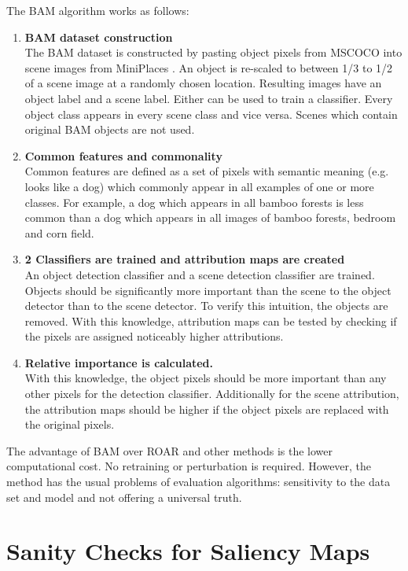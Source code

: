 The BAM algorithm works as follows:
\begin{enumerate}
	\item \textbf{BAM dataset construction}\\
	The BAM dataset is constructed by pasting object pixels from MSCOCO \cite{lin2015microsoft} into scene images from MiniPlaces \cite{zhou2016places}. An object is re-scaled to between 1/3 to 1/2 of a scene image at a randomly chosen location. Resulting images have an object label and a scene label. Either can be used to train a classifier. Every object class appears in every scene class and vice versa. Scenes which contain original BAM objects are not used.
	\item \textbf{Common features and commonality}\\
	Common features are defined as a set of pixels with semantic meaning (e.g. looks like a dog) which commonly appear in all examples of one or more classes. For example, a dog which appears in all bamboo forests is less common than a dog  which appears in all images of bamboo forests, bedroom and corn field.
	\item \textbf{2 Classifiers are trained and attribution maps are created}\\
	An object detection classifier and a scene detection classifier are trained. Objects should be significantly more important than the scene to the object detector  than to the scene detector. To verify this intuition, the objects are removed. With this knowledge, attribution maps can be tested by checking if the pixels are assigned noticeably higher attributions.
	\item \textbf{Relative importance is calculated.}\\
	With this knowledge, the object pixels should be more important than any other pixels for the detection classifier. Additionally for the scene attribution, the attribution maps should be higher if the object pixels are replaced with the original pixels.
\end{enumerate}


The advantage of BAM over ROAR \cite{hooker2019benchmark} and other methods is the lower computational cost. No retraining or perturbation is required. However, the method has the usual problems of evaluation algorithms: sensitivity to the data set and model and not offering a universal truth.


\section{Sanity Checks for Saliency Maps \cite{adebayo2020sanity}}

